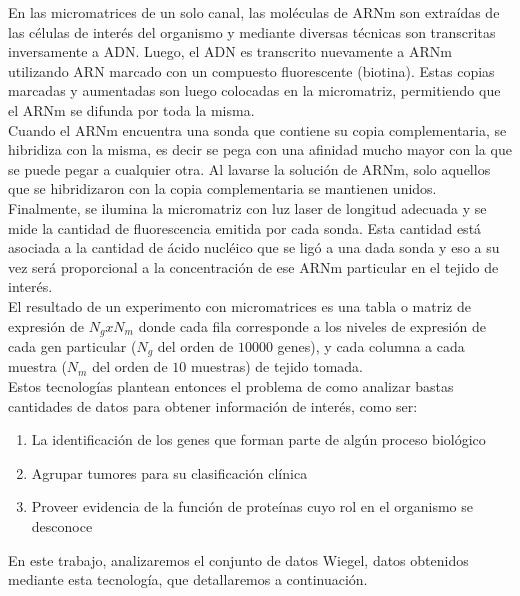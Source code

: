 En las micromatrices de un solo canal, las moléculas de ARNm son extraídas de las células de interés del organismo y mediante diversas técnicas son transcritas inversamente a ADN. Luego, el ADN es transcrito nuevamente a ARNm utilizando ARN marcado con un compuesto fluorescente (biotina). Estas copias marcadas y aumentadas son luego colocadas en la micromatriz, permitiendo que el ARNm se difunda por toda la misma.\\
Cuando el ARNm encuentra una sonda que contiene su copia complementaria, se hibridiza con la misma, es decir se pega con una afinidad mucho mayor con la que se puede pegar a cualquier otra. Al lavarse la solución de ARNm, solo aquellos que se hibridizaron con la copia complementaria se mantienen unidos. Finalmente, se ilumina la micromatriz con luz laser de longitud adecuada y se mide la cantidad de fluorescencia emitida por cada sonda. Esta cantidad está asociada a la cantidad de ácido nucléico que se ligó a una dada sonda y eso a su vez será proporcional a la concentración de ese ARNm particular en el tejido de interés.\\
El resultado de un experimento con micromatrices es una tabla o matriz de expresión de $N_g x N_m$ donde cada fila corresponde a los niveles de expresión de cada gen particular ($N_g$ del orden de $10000$ genes), y cada columna a cada muestra ($N_m$ del orden de $10$ muestras) de tejido tomada.\\
Estos tecnologías plantean entonces el problema de como analizar bastas cantidades de datos para obtener información de interés, como ser:
\begin{enumerate}
	\item La identificación de los genes que forman parte de algún proceso biológico
	\item Agrupar tumores para su clasificación clínica
	\item Proveer evidencia de la función de proteínas cuyo rol en el organismo se desconoce
\end{enumerate}
En este trabajo, analizaremos el conjunto de datos Wiegel, datos obtenidos mediante esta tecnología, que detallaremos a continuación.\cite{Babu2004,Schulze2001,Domany2003}
